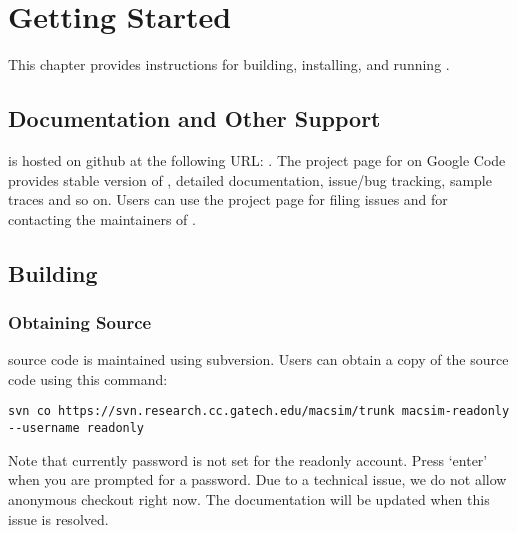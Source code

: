 

\chapter{Getting Started}


This chapter provides instructions for building, installing, and running \SIM.


\section{Documentation and Other Support}

\SIM is hosted on github at the following URL:
. 
The project page for \SIM on
Google Code provides stable version of \SIM, detailed documentation,
issue/bug tracking, sample traces and so on. Users can use the project
page for filing issues and for contacting the maintainers of \SIM.


\section{Building \SIM}
\label{sec:installation}


\subsection{Obtaining Source}

\SIM source code is maintained using subversion. Users can obtain a copy of the
source code using this command:

\begin{Verbatim}
svn co https://svn.research.cc.gatech.edu/macsim/trunk macsim-readonly --username readonly
\end{Verbatim}

\noindent
Note that currently password is not set for the readonly account. Press `enter' when you are prompted for a password. Due to a technical issue, we do
not allow anonymous checkout right now. The documentation will be updated when this issue is resolved.

